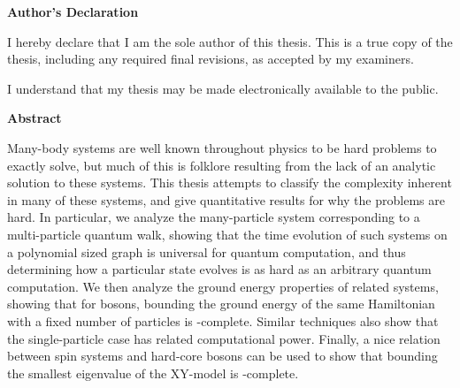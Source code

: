 \pagestyle{plain}
\setcounter{page}{2}

\cleardoublepage %

 



\begin{center}\textbf{Author's Declaration}\end{center}

  \noindent
I hereby declare that I am the sole author of this thesis. This is a true copy of the thesis, including any required final revisions, as accepted by my examiners.

  \bigskip
  
  \noindent
I understand that my thesis may be made electronically available to the public.

\cleardoublepage



\begin{center}\textbf{Abstract}\end{center}

Many-body systems are well known throughout physics to be hard problems to exactly solve, but much of this is folklore resulting from the lack of an analytic solution to these systems.  This thesis attempts to classify the complexity inherent in many of these systems, and give quantitative results for why the problems are hard.  In particular, we analyze the many-particle system corresponding to a multi-particle quantum walk, showing that the time evolution of such systems on a polynomial sized graph is universal for quantum computation, and thus determining how a particular state evolves is as hard as an arbitrary quantum computation.  We then analyze the ground energy properties of related systems, showing that for bosons, bounding the ground energy of the same Hamiltonian with a fixed number of particles is \QMA-complete.  Similar techniques also show that the single-particle case has related computational power.  Finally, a nice relation between spin systems and hard-core bosons can be used to show that bounding the smallest eigenvalue of the XY-model is \QMA-complete.


\cleardoublepage


